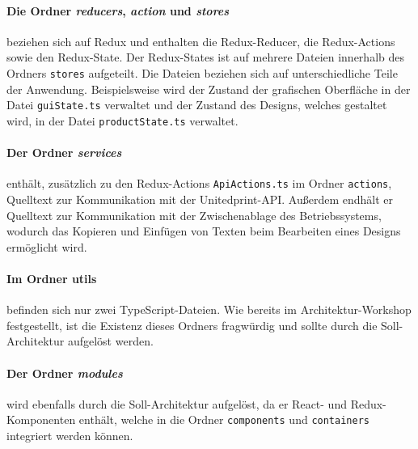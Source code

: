 \paragraph{Die Ordner \emph{reducers}, \emph{action} und \emph{stores}} beziehen sich auf Redux und enthalten die Redux-Reducer, die Redux-Actions sowie den Redux-State. Der Redux-States ist auf mehrere Dateien innerhalb des Ordners \lstinline|stores| aufgeteilt. Die Dateien beziehen sich auf unterschiedliche Teile der Anwendung. Beispielsweise wird der Zustand der grafischen Oberfläche in der Datei \lstinline|guiState.ts| verwaltet und der Zustand des Designs, welches gestaltet wird, in der Datei \lstinline|productState.ts| verwaltet. 

\paragraph{Der Ordner \emph{services}} enthält, zusätzlich zu den Redux-Actions \lstinline|ApiActions.ts| im Ordner \lstinline|actions|,  Quelltext zur Kommunikation mit der Unitedprint-API. Außerdem endhält er Quelltext zur Kommunikation mit der Zwischenablage des Betriebssystems, wodurch das Kopieren und Einfügen von Texten beim Bearbeiten eines Designs ermöglicht wird.


\paragraph{Im Ordner utils} befinden sich nur zwei TypeScript-Dateien. Wie bereits im Architektur-Workshop festgestellt, ist die Existenz dieses Ordners fragwürdig und sollte durch die Soll-Architektur aufgelöst werden.  

\paragraph{Der Ordner \emph{modules}} wird ebenfalls durch die Soll-Architektur aufgelöst, da er React- und Redux-Komponenten enthält, welche in die Ordner \lstinline|components| und \lstinline|containers| integriert werden können.


